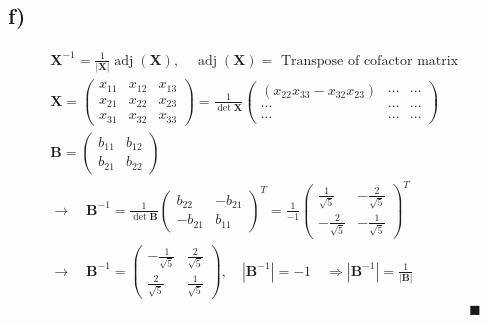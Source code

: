 \documentclass[fleqn]{article}
\DeclareMathOperator{\adj}{adj}
\begin{document}
\subsection*{f) }
\begin{align*}
	&\mathbf{X}^{-1}=\frac{1}{\left|\mathbf{X}\right|}\adj\left(\mathbf{X}\right),\quad\adj\left(\mathbf{X}\right)=\text{ Transpose of cofactor matrix}& \\
	&\mathbf{X}=
	\begin{pmatrix}
	x_{11} & x_{12} & x_{13} \\
	x_{21} & x_{22} & x_{23} \\
	x_{31} & x_{32} & x_{33}
	\end{pmatrix}=\frac{1}{\det\mathbf{X}}
	\begin{pmatrix}
		\left(x_{22}x_{33}-x_{32}x_{23}\right) & \cdots & \cdots \\
		\cdots & \cdots & \cdots \\
		\cdots & \cdots & \cdots
	\end{pmatrix}& \\
	&\mathbf{B}=
	\begin{pmatrix}
	b_{11} & b_{12} \\
	b_{21} & b_{22}
	\end{pmatrix}& \\
	&\rightarrow\quad\mathbf{B}^{-1}=\frac{1}{\det\mathbf{B}}
	\begin{pmatrix}
	b_{22} & -b_{21} \\
	-b_{21} & b_{11}
	\end{pmatrix}^{T}=\frac{1}{-1}
	\begin{pmatrix}
	\frac{1}{\sqrt{5}} & -\frac{2}{\sqrt{5}} \\
	-\frac{2}{\sqrt{5}} & -\frac{1}{\sqrt{5}}
	\end{pmatrix}^{T}& \\
	&\rightarrow\quad\mathbf{B}^{-1}=
	\begin{pmatrix}
	-\frac{1}{\sqrt{5}} & \frac{2}{\sqrt{5}} \\
	\frac{2}{\sqrt{5}} & \frac{1}{\sqrt{5}}
	\end{pmatrix},\quad\left|\mathbf{B}^{-1}\right|=-1\quad\Rightarrow\left|\mathbf{B}^{-1}\right|=\frac{1}{\left|\mathbf{B}\right|}& \\
	&&\blacksquare
\end{align*}
\end{document}
